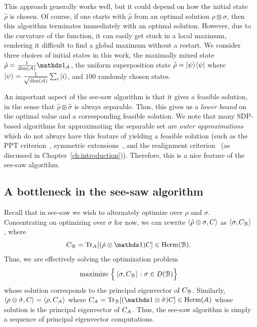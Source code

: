 This approach generally works well, but it could depend on how the initial state $\hat{\rho}$ is chosen. 
Of course, if one starts with $\hat{\rho}$ from an optimal solution $\rho \otimes \sigma$, then this algorithm terminates immediately with an optimal solution. 
However, due to the curvature of the function, it can easily get stuck in a local maximum, rendering it difficult to find a global maximum without a restart. 
We consider three choices of initial states in this work, the maximally mixed state $\hat{\rho} = \frac{1}{\dim(\A)}\id_\A$, the uniform superposition state $\hat{\rho} = | \psi \rangle \langle \psi |$ where $\ket{\psi} = \frac{1}{\sqrt{\dim(\mathcal{A})}} \sum_{i} \ket{i}$, and $100$ randomly chosen states.  

An important aspect of the see-saw algorithm is that it gives a feasible solution, in the sense that $\hat{\rho} \otimes \hat{\sigma}$ is always separable. 
Thus, this gives us a \emph{lower bound} on the optimal value and a corresponding feasible solution. 
We note that many SDP-based algorithms for approximating the separable set are \emph{outer approximations} which do not always have this feature of yielding a feasible solution (such as the PPT criterion~\cite{horodecki1996necessary, peres1996separability}, symmetric extensions~\cite{doherty2002SymExt, chen2014symmetric, li2019symmetric}, and the realignment criterion~\cite{chen2003matrix} (as discussed in Chapter~\ref{ch:introduction})). 
Therefore, this is a nice feature of the see-saw algorithm. 


\subsection{A bottleneck in the see-saw algorithm} \label{sec:ch2_SEP-faster_see-saw} 

Recall that in see-saw we wish to alternately optimize over $\rho$ and $\sigma$. 
Concentrating on optimizing over $\sigma$ for now, we can rewrite $\left\langle \hat{\rho} \otimes \sigma, C \right\rangle$ as $\left\langle \sigma, C_{\mathcal{B}} \right\rangle$, where $$C_\B = \Tr_\A[(\hat{\rho} \otimes \id)C] \in \Herm(\B).$$ %
Thus, we are effectively solving the optimization problem 
\begin{equation}
    \text{maximize } \Big\{ \left\langle \sigma, C_{\mathcal{B}} \right\rangle : \sigma \in D(\mathcal{B}) \Big\}
\end{equation}
whose solution corresponds to the principal eigenvector of $C_{\mathcal{B}}$.
Similarly, $\left\langle \rho \otimes \hat{\sigma}, C \right\rangle = \left\langle \rho, C_{\mathcal{A}} \right\rangle$ where $C_\A = \Tr_\B[(\id \otimes \hat{\sigma})C] \in \Herm(\A)$  
whose solution is the principal eigenvector of $C_{\mathcal{A}}$. 
Thus, the see-saw algorithm is simply a sequence of principal eigenvector computations. 

